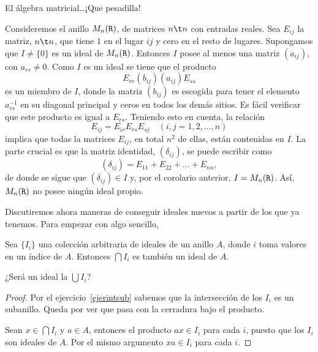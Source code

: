 \begin{nota}
	El álgebra matricial\ldots ¡Que pesadilla!
\end{nota}
\begin{ejem} 
		Consideremos el anillo $M_{n}(\texttt{R})$, de matrices $n\t n$ con entradas reales. Sea $E_{ij}$ la matriz, $n\t n$, que tiene $1$ en el lugar $ij$ y cero en el resto de lugares. 
		Supongamos que $I \neq \{0\}$ es un ideal de $M_{n}(\texttt{R})$. Entonces $I$ posee al menos una matriz $(a_{ij})$, con $a_{rs} \neq 0$. Como $I$ es un ideal se tiene que el producto 
		\[ E_{rr}(b_{ij})(a_{ij})E_{ss} \]
		es un miembro de $I$, donde la matriz $(b_{ij})$ es escogida para tener el elemento $a_{rs}^{-1}$ en su diagonal principal y ceros en todos los demás sitios. Es fácil verificar que este producto es igual a $E_{rs}$. Teniendo esto en cuenta, la relación
		\[ E_{ij} = E_{ir}E_{rs}E_{sj} \quad (i,j = 1,2,\dots,n) \]
		implica que todas la matrices $E_{ij}$, en total $n^2$ de ellas, están contenidas en $I$. La parte crucial es que la matriz identidad, $(\delta_{ij})$, se puede escribir como
		\[ (\delta_{ij})  = E_{11} + E_{22} + \dots + E_{nn}, \]
		de donde se sigue que $(\delta_{ij}) \in I$ y, por el corolario anterior, $I = M_{n}(\texttt{R})$. Así, $M_{n}(\texttt{R})$ no posee ningún ideal propio.
\end{ejem}
%
Discutiremos ahora maneras de conseguir ideales nuevos a partir de los que ya tenemos. Para empezar con algo sencillo,

 \begin{teo}\label{interideales} 
 		Sea $\{I_i\}$ una colección arbitraria de ideales de un anillo $A$, donde $i$ toma valores en un índice de $A$. Entonces $\bigcap I_i$ es también un ideal de $A$. 
 \end{teo} 
\begin{nota}
	¿Será un ideal la $\bigcup I_i$?
\end{nota}
\begin{proof} Por el ejercicio~\ref{ejerintsub} sabemos que la intersección de los $I_i$ es un subanillo. Queda por ver que pasa con la cerradura bajo el producto.
	
	Sean $x\in \bigcap I_i$ y $a\in A$, entonces el producto $ax \in I_i$ para cada $i$, puesto que los $I_i$ son ideales de $A$. Por el mismo argumento $xa \in I_i$ para cada $i$.
\end{proof}
%
